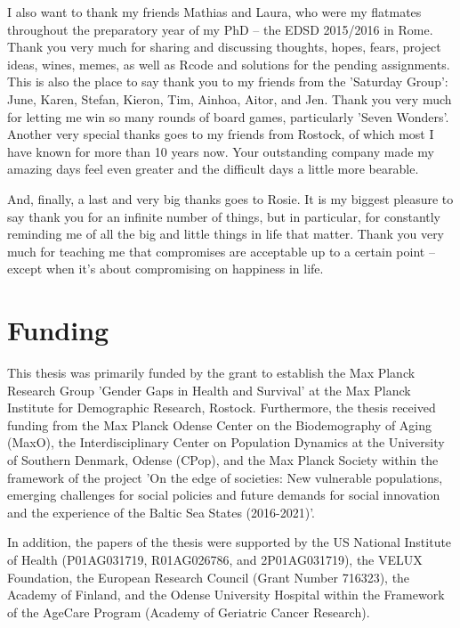 I also want to thank my friends Mathias and Laura, who were my 
flatmates throughout the preparatory year of my PhD -- the EDSD 
2015/2016 in Rome. Thank you very much for sharing and discussing 
thoughts, hopes, fears, project ideas, wines, memes, as well as Rcode 
and solutions for the pending assignments. This is also the place to 
say thank you to my friends from the 'Saturday Group': June, Karen, 
Stefan, Kieron, Tim, Ainhoa, Aitor, and Jen. Thank you very much 
for letting me win so many rounds of board games, particularly
'Seven Wonders'. Another very special thanks goes to my friends from 
Rostock, of which most I have known for more than 10 years now. Your 
outstanding company made my amazing days feel even greater and the 
difficult days a little more bearable.

And, finally, a last and very big thanks goes to Rosie. It is my biggest 
pleasure to say thank you for an infinite number of things, but in 
particular, for constantly reminding me of all the big and little things 
in life that matter. Thank you very much for teaching me that compromises 
are acceptable up to a certain point -- except when it's about compromising 
on happiness in life. 


\chapter{Funding}

This thesis was primarily funded by the grant to establish the Max Planck 
Research Group 'Gender Gaps in Health and Survival' at the Max Planck Institute 
for Demographic Research, Rostock. Furthermore, the thesis received funding 
from the Max Planck Odense Center on the Biodemography of Aging (MaxO), the 
Interdisciplinary Center on Population Dynamics at the University of Southern 
Denmark, Odense (CPop), and the Max Planck Society within the framework of 
the project 'On the edge of societies: New vulnerable populations, emerging 
challenges for social policies and future demands for social innovation and 
the experience of the Baltic Sea States (2016-2021)'. 

In addition, the papers of the thesis were supported by the US National 
Institute of Health (P01AG031719, R01AG026786, and 2P01AG031719), 
the VELUX Foundation, the European Research Council (Grant Number 716323), 
the Academy of Finland, and the Odense University Hospital within the 
Framework of the AgeCare Program (Academy of Geriatric Cancer Research). 

